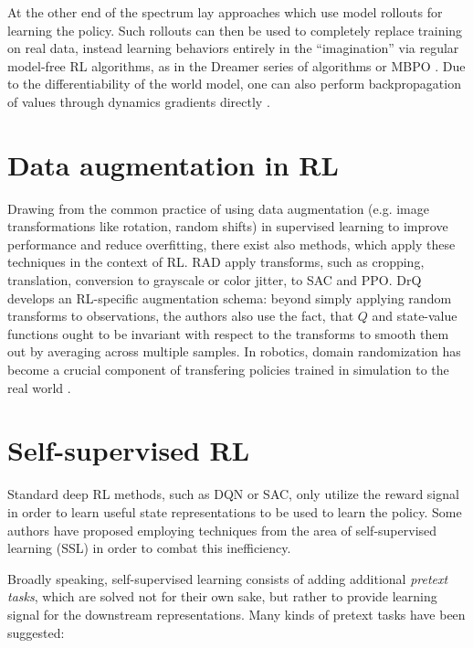 \documentclass[en]{pracamgr}
\begin{document}
At the other end of the spectrum lay approaches which use model rollouts for learning the policy. Such rollouts can then be used to completely replace training on real data, instead learning behaviors entirely in the ``imagination'' via regular model-free RL algorithms, as in the Dreamer series of algorithms \autocite{hafnerDreamControlLearning2020,hafnerMasteringAtariDiscrete2022,hafnerMasteringDiverseDomains2024} or MBPO \autocite{jannerWhenTrustYour2021}. Due to the differentiability of the world model, one can also perform backpropagation of values through dynamics gradients directly \autocite{hafnerDreamControlLearning2020}.

\section{Data augmentation in RL}

Drawing from the common practice of using data augmentation (e.g. image transformations like rotation, random shifts) in supervised learning to improve performance and reduce overfitting, there exist also methods, which apply these techniques in the context of RL. RAD \autocite{laskinReinforcementLearningAugmented2020} apply transforms, such as cropping, translation, conversion to grayscale or color jitter, to SAC and PPO. DrQ \autocite{kostrikovImageAugmentationAll2021} develops an RL-specific augmentation schema: beyond simply applying random transforms to observations, the authors also use the fact, that $Q$ and state-value functions ought to be invariant with respect to the transforms to smooth them out by averaging across multiple samples. In robotics, domain randomization has become a crucial component of transfering policies trained in simulation to the real world \autocite{tobinDomainRandomizationTransferring2017,openaiSolvingRubiksCube2019}.

\section{Self-supervised RL}

Standard deep RL methods, such as DQN or SAC, only utilize the reward signal in order to learn useful state representations to be used to learn the policy. Some authors have proposed employing techniques from the area of self-supervised learning (SSL) in order to combat this inefficiency.

Broadly speaking, self-supervised learning consists of adding additional \emph{pretext tasks}, which are solved not for their own sake, but rather to provide learning signal for the downstream representations. Many kinds of pretext tasks have been suggested:
\end{document}
